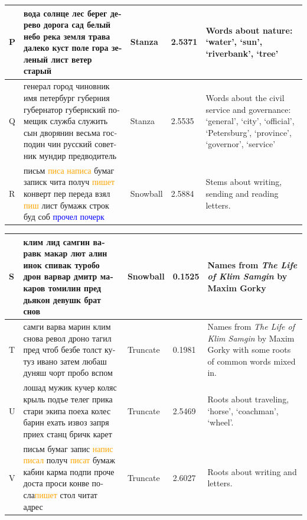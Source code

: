 \documentclass[11pt,a4paper]{article}
\begin{document}
\begin{landscape}
\begin{center}
\begin{tabularx}{\textwidth}{|l|X|l|l|X|}
    P & \foreignlanguage{russian}{вода солнце лес берег дерево дорога сад белый небо река земля трава далеко куст поле гора зеленый лист ветер старый} & Stanza & 2.5371 & Words about nature: `water', `sun', `riverbank', `tree' \\ \hline
    Q & \foreignlanguage{russian}{генерал город чиновник имя петербург губерния губернатор губернский помещик служба служить сын дворянин весьма господин чин русский советник мундир предводитель} & Stanza & 2.5535 & Words about the civil service and governance: `general', `city', `official', `Petersburg', `province', `governor', `service' \\ \hline
    R & \foreignlanguage{russian}{письм \textcolor{orange}{писа написа} бумаг записк чита получ \textcolor{orange}{пишет} конверт пер переда взял \textcolor{orange}{пиш} лист бумажк строк буд соб \textcolor{blue}{прочел почерк}} & Snowball & 2.5884 & Stems about writing, sending and reading letters. \\ \hline
    \end{tabularx}
\end{center}
    \begin{tabularx}{\textwidth}{|l|X|l|l|X|}\hline
    S & \foreignlanguage{russian}{клим лид самгин варавк макар лют алин инок спивак туробо дрон варвар дмитр макаров томилин пред дьякон девушк брат снов} & Snowball & 0.1525 & Names from \textit{The Life of Klim Samgin} by Maxim Gorky \\ \hline
    T & \foreignlanguage{russian}{самги варва марин клим снова револ дроно тагил пред чтоб безбе толст кутуз ивано затем любаш дуняш чорт пробо вспом} & Truncate & 0.1981 & Names from \textit{The Life of Klim Samgin} by Maxim Gorky with some roots of common words mixed in. \\ \hline
    U & \foreignlanguage{russian}{лошад мужик кучер коляс крыль подъе телег прика стари экипа поеха колес барин ехать извоз запря приех станц бричк карет} & Truncate & 2.5469 & Roots about traveling, `horse', `coachman', `wheel'. \\ \hline
    V & \foreignlanguage{russian}{письм бумаг запис \textcolor{orange}{напис писал} получ \textcolor{orange}{писат} бумаж кабин карма подпи проче доста проси конве посла\textcolor{orange}{пишет} стол читат адрес} & Truncate & 2.6027 & Roots about writing and letters. \\ \hline
    \end{tabularx}

\end{landscape}
\end{document}
